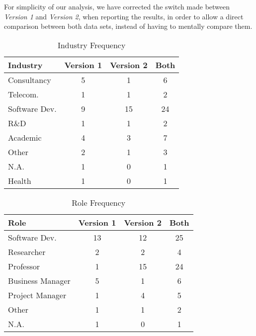 For simplicity of our analysis, we have corrected the switch made between \textit{Version 1} and \textit{Version 2}, when reporting the results, in order to allow a direct comparison between both data sets, instead of having to mentally compare them.

\begin{table}[htb]
	\centering
	\caption{Industry Frequency}
	\label{tab: industry}
	\begin{tabular}{l|cc|c}
		\hline \bf Industry & \bf Version 1 & \bf Version 2 & \bf Both \\ \hline
		Consultancy         & 5             & 1             & 6        \\
		Telecom.            & 1             & 1             & 2        \\
		Software Dev.       & 9             & 15            & 24       \\
		R\&D                & 1             & 1             & 2        \\
		Academic            & 4             & 3             & 7        \\
		Other               & 2             & 1             & 3        \\
		N.A.                & 1             & 0             & 1        \\
		Health              & 1             & 0             & 1        \\
		\hline
	\end{tabular}
\end{table}

\begin{table}[htb]
	\centering
	\caption{Role Frequency}
	\label{tab: roles}
	\begin{tabular}{l|cc|c}
		\hline \bf Role  & \bf Version 1 & \bf Version 2 & \bf Both \\ \hline
		Software Dev.    & 13            & 12            & 25       \\
		Researcher       & 2             & 2             & 4        \\
		Professor        & 1             & 15            & 24       \\
		Business Manager & 5             & 1             & 6        \\
		Project Manager  & 1             & 4             & 5        \\
		Other            & 1             & 1             & 2        \\
		N.A.             & 1             & 0             & 1        \\
		\hline
	\end{tabular}
\end{table}

